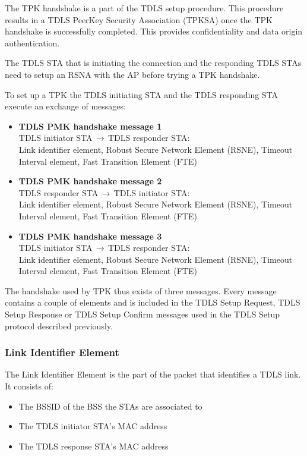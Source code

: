 The TPK handshake is a part of the TDLS setup procedure. This procedure results in a TDLS PeerKey Security Association (TPKSA) once the TPK handshake is successfully completed. This provides confidentiality and data origin authentication.

The TDLS STA that is initiating the connection and the responding TDLS STAs need to setup an RSNA with the AP before trying a TPK handshake. 

To set up a TPK the TDLS initiating STA and the TDLS responding STA execute an exchange of messages:

\begin{itemize}
	\item[] \textbf{TDLS PMK handshake message 1}\\ TDLS initiator STA$\,\to\,$TDLS responder STA:\\
	Link identifier element, Robust Secure Network Element (RSNE), Timeout Interval element, Fast Transition Element (FTE)
	\item[] \textbf{TDLS PMK handshake message 2}\\ TDLS responder STA$\,\to\,$TDLS initiator STA:\\
	Link identifier element, Robust Secure Network Element (RSNE), Timeout Interval element, Fast Transition Element (FTE)
	\item[] \textbf{TDLS PMK handshake message 3}\\ TDLS initiator STA$\,\to\,$TDLS responder STA:\\
	Link identifier element, Robust Secure Network Element (RSNE), Timeout Interval element, Fast Transition Element (FTE)
\end{itemize}

The handshake used by TPK thus exists of three messages. Every message contains a couple of elements and is included in the TDLS Setup Request, TDLS Setup Response or TDLS Setup Confirm messages used in the TDLS Setup protocol described previously.

\subsubsection{Link Identifier Element}

The Link Identifier Element is the part of the packet that identifies a TDLS link.
It consists of:

\begin{itemize}
	\item The BSSID of the BSS the STAs are associated to
	\item The TDLS initiator STA's MAC address
	\item The TDLS response STA's MAC address
\end{itemize}


